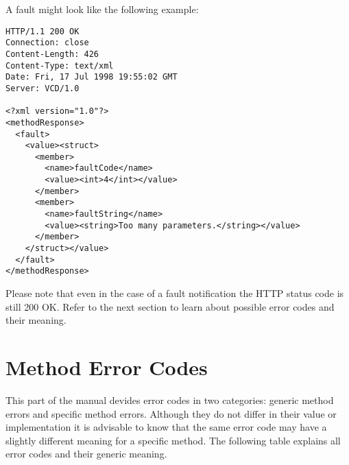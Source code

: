 A fault might look like the following example:

\begin{verbatim}
HTTP/1.1 200 OK
Connection: close
Content-Length: 426
Content-Type: text/xml
Date: Fri, 17 Jul 1998 19:55:02 GMT
Server: VCD/1.0

<?xml version="1.0"?>
<methodResponse>
  <fault>
    <value><struct>
      <member>
        <name>faultCode</name>
        <value><int>4</int></value>
      </member>
      <member>
        <name>faultString</name>
        <value><string>Too many parameters.</string></value>
      </member>
    </struct></value>
  </fault>
</methodResponse>
\end{verbatim}

Please note that even in the case of a fault notification the HTTP status code
is still 200 OK. Refer to the next section to learn about possible error codes
and their meaning.


\section{Method Error Codes}

This part of the manual devides error codes in two categories: generic method
errors and specific method errors. Although they do not differ in their value
or implementation it is advisable to know that the same error code may have a
slightly different meaning for a specific method. The following table explains
all error codes and their generic meaning.

